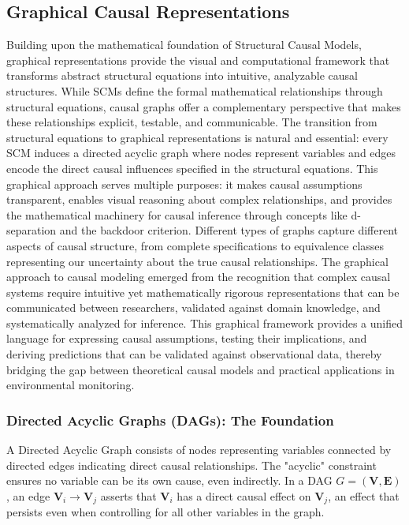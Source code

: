 \subsection{Graphical Causal Representations}

Building upon the mathematical foundation of Structural Causal Models, graphical representations provide the visual and computational framework that transforms abstract structural equations into intuitive, analyzable causal structures. While SCMs define the formal mathematical relationships through structural equations, causal graphs offer a complementary perspective that makes these relationships explicit, testable, and communicable. The transition from structural equations to graphical representations is natural and essential: every SCM induces a directed acyclic graph where nodes represent variables and edges encode the direct causal influences specified in the structural equations. This graphical approach serves multiple purposes: it makes causal assumptions transparent, enables visual reasoning about complex relationships, and provides the mathematical machinery for causal inference through concepts like d-separation and the backdoor criterion. Different types of graphs capture different aspects of causal structure, from complete specifications to equivalence classes representing our uncertainty about the true causal relationships. The graphical approach to causal modeling emerged from the recognition that complex causal systems require intuitive yet mathematically rigorous representations that can be communicated between researchers, validated against domain knowledge, and systematically analyzed for inference. This graphical framework provides a unified language for expressing causal assumptions, testing their implications, and deriving predictions that can be validated against observational data, thereby bridging the gap between theoretical causal models and practical applications in environmental monitoring.

\subsubsection{Directed Acyclic Graphs (DAGs): The Foundation}

A Directed Acyclic Graph consists of nodes representing variables connected by directed edges indicating direct causal relationships. The "acyclic" constraint ensures no variable can be its own cause, even indirectly. In a DAG $G = (\mathbf{V}, \mathbf{E})$, an edge $\mathbf{V}_i \rightarrow \mathbf{V}_j$ asserts that $\mathbf{V}_i$ has a direct causal effect on $\mathbf{V}_j$, an effect that persists even when controlling for all other variables in the graph.

